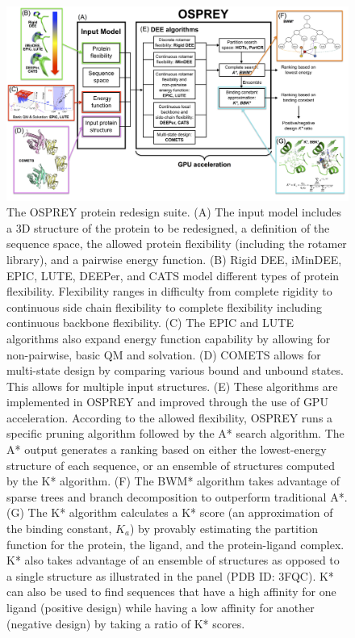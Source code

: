 \begin{figure}
\center
\includegraphics[width=6in]{figures/osprey_mantra.png}
 \vspace{-0.3in}%
\caption{The OSPREY protein redesign suite. (A) The input model includes a 3D structure of the protein to be redesigned, a definition of the sequence space, the allowed protein flexibility (including the rotamer library), and a pairwise energy function. (B) Rigid DEE, iMinDEE, EPIC, LUTE, DEEPer, and CATS model different types of protein flexibility. Flexibility ranges in difficulty from complete rigidity to continuous side chain flexibility to complete flexibility including continuous backbone flexibility. (C) The EPIC and LUTE algorithms also expand energy function capability by allowing for non-pairwise, basic QM and solvation. (D) COMETS allows for multi-state design by comparing various bound and unbound states. This allows for multiple input structures. (E) These algorithms are implemented in OSPREY and improved through the use of GPU acceleration. According to the allowed flexibility, OSPREY runs a specific pruning algorithm followed by the A* search algorithm. The A* output generates a ranking based on either the lowest-energy structure of each sequence, or an ensemble of structures computed by the K* algorithm. (F) The BWM* algorithm takes advantage of sparse trees and branch decomposition to outperform traditional A*. (G) The K* algorithm calculates a K* score (an approximation of the binding constant, $K_a$) by provably estimating the partition function for the protein, the ligand, and the protein-ligand complex. K* also takes advantage of an ensemble of structures as opposed to a single structure as illustrated in the panel (PDB ID: 3FQC). K* can also be used to find sequences that have a high affinity for one ligand (positive design) while having a low affinity for another (negative design) by taking a ratio of K* scores. }
\label{flowchart}
\end{figure}

